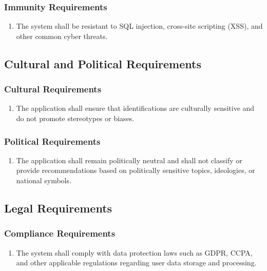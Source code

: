 \documentclass[]{article}
\begin{document}
\subsubsection{Immunity Requirements}
\label{ssub:immunity_requirements}
\begin{enumerate}[{SR-IM}1. ]
	\item The system shall be resistant to SQL injection, cross-site scripting (XSS), and other common cyber threats.
\end{enumerate}


\subsection{Cultural and Political Requirements}
\label{sub:cultural_and_political_requirements}

\subsubsection{Cultural Requirements}
\label{ssub:cultural_requirements}
\begin{enumerate}[{CP-C}1. ]
	\item The application shall ensure that identifications are culturally sensitive and do not promote stereotypes or biases.
\end{enumerate}

\subsubsection{Political Requirements}
\label{ssub:political_requirements}
\begin{enumerate}[{CP-P}1. ]
	\item The application shall remain politically neutral and shall not classify or provide recommendations based on politically sensitive topics, ideologies, or national symbols.
\end{enumerate}


\subsection{Legal Requirements}
\label{sub:legal_requirements}

\subsubsection{Compliance Requirements}
\label{ssub:compliance_requirements}
\begin{enumerate}[{LR-COMP}1. ]
	\item The system shall comply with data protection laws such as GDPR, CCPA, and other applicable regulations regarding user data storage and processing.
\end{enumerate}
\end{document}

